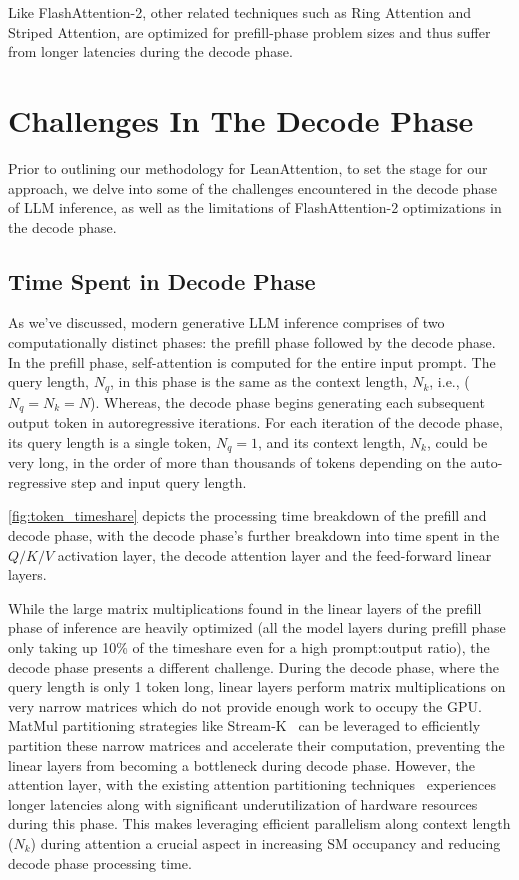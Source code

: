 Like FlashAttention-2, other related techniques such as Ring Attention\cite{liu2023ring} and Striped Attention\cite{brandon2023striped}, are optimized for prefill-phase problem sizes and thus suffer from longer latencies during the decode phase. 

\section{Challenges In The Decode Phase}
\label{sec:challenges}
Prior to outlining our methodology for LeanAttention, to set the stage for our approach, we delve into some of the challenges encountered in the decode phase of LLM inference, as well as the limitations of FlashAttention-2 optimizations in the decode phase.

\subsection{Time Spent in Decode Phase}
\label{subsec:decodetimespent}

As we've discussed, modern generative LLM inference comprises of two computationally distinct phases: the prefill phase followed by the decode phase. In the prefill phase, self-attention is computed for the entire input prompt. The query length, $N_q$, in this phase is the same as the context length, $N_k$, i.e., ($N_q = N_k = N$). Whereas, the decode phase begins generating each subsequent output token in autoregressive iterations. For each iteration of the decode phase, its query length is a single token, $N_q=1$, and its context length, $N_k$, could be very long, in the order of more than thousands of tokens depending on the auto-regressive step and input query length.

\autoref{fig:token_timeshare} depicts the processing time breakdown of the prefill and decode phase, with the decode phase's further breakdown into time spent in the $Q/K/V$ activation layer, the decode attention layer and the feed-forward linear layers.  

While the large matrix multiplications found in the linear layers of the prefill phase of inference are heavily optimized (all the model layers during prefill phase only taking up 10\% of the timeshare even for a high prompt:output ratio), the decode phase presents a different challenge. During the decode phase, where the query length is only 1 token long, linear layers perform matrix multiplications on very narrow matrices which do not provide enough work to occupy the GPU. MatMul partitioning strategies like Stream-K~\cite{streamk} can be leveraged to efficiently partition these narrow matrices and accelerate their computation, preventing the linear layers from becoming a bottleneck during decode phase. However, the attention layer, with the existing attention partitioning techniques~\cite{dao2022flashattention, dao2023flashattention2, flashdecoding, flashinfer} experiences longer latencies along with significant underutilization of hardware resources during this phase. This makes leveraging efficient parallelism along context length ($N_k$) during attention a crucial aspect in increasing SM occupancy and reducing decode phase processing time.

